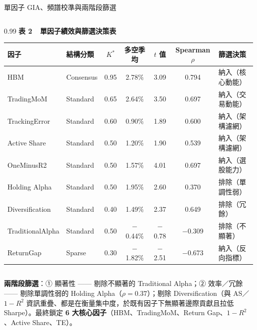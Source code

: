 \documentclass[aspectratio=169,11pt,t]{beamer}   %
\newcommand{\hl}[1]{\textcolor{nccured}{\textbf{#1}}}     %
\begin{document}
\begin{frame}{單因子 GIA、頻譜校準與兩階段篩選}
\vspace{-0.1cm}
\footnotesize
\begin{columns}[T]
\begin{column}{0.99\textwidth}
\centering
\textbf{表 2\ \ 單因子績效與篩選決策表}\\[3pt]
\begin{tabular}{l l c c c c l}
\toprule
因子 & 結構分類 & $K^{*}$ & 多空季均 & $t$ 值 & Spearman $\rho$ & 篩選決策 \\
\midrule
HBM            & Consensus & 0.95 & 2.78\% & 3.09 & 0.794 & 納入（核心動能） \\
TradingMoM     & Standard  & 0.65 & 2.64\% & 3.50 & 0.697 & 納入（交易動能） \\
TrackingError  & Standard  & 0.60 & 0.90\% & 1.89 & 0.600 & 納入（架構濾網） \\
Active Share   & Standard  & 0.50 & 1.20\% & 1.90 & 0.539 & 納入（架構濾網） \\
OneMinusR2     & Standard  & 0.50 & 1.57\% & 4.01 & 0.697 & 納入（選股能力） \\
Holding Alpha  & Standard  & 0.50 & 1.95\% & 2.60 & 0.370 & \textcolor{nccured}{排除（單調性弱）} \\
Diversification& Standard  & 0.40 & 1.49\% & 2.37 & 0.649 & \textcolor{nccured}{排除（冗餘）} \\
TraditionalAlpha& Standard & 0.50 & $-$0.44\% & $-$0.78 & $-$0.309 & \textcolor{nccured}{排除（不顯著）} \\
ReturnGap      & Sparse    & 0.30 & $-$1.82\% & $-$2.51 & $-$0.673 & 納入（反向指標） \\
\bottomrule
\end{tabular}
\end{column}
\end{columns}
\vspace{5pt}
\scriptsize
\textbf{兩階段篩選}：① 顯著性 —— 剔除不顯著的 Traditional Alpha；② 效率／冗餘 —— 剔除單調性弱的 Holding Alpha（$\rho=0.37$）；剔除 Diversification（與 AS／$1-R^2$ 資訊重疊、都是在衡量集中度，於既有因子下無顯著邊際貢獻且拉低 Sharpe）。最終鎖定 \hl{6 大核心因子}（HBM、TradingMoM、Return Gap、$1-R^2$、Active Share、TE）。
\end{frame}
\end{document}
